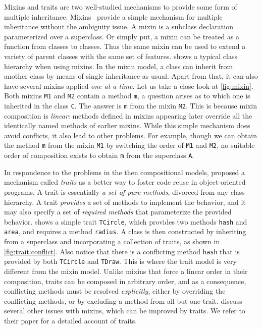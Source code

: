 Mixins and traits are two well-studied mechanisms to provide some form of
multiple inheritance. Mixins~\citep{bracha1990mixin} provide a simple mechanism
for multiple inheritance without the ambiguity issue. A mixin is a subclass
declaration parameterized over a superclass. Or simply put, a mixin can be
treated as a function from classes to classes. Thus the same mixin can be used to
extend a variety of parent classes with the same set of features.
 shows a typical class hierarchy when using mixins. In the mixin
model, a class can inherit from another class by means of single inheritance as
usual. Apart from that, it can also have several mixins applied \emph{one at a
  time}. Let us take a close look at \cref{fig:mixin}. Both mixins
\lstinline{M1} and \lstinline{M2} contain a method \lstinline{m}, a question
arises as to which one is inherited in the class \lstinline{C}. The answer is
\lstinline{m} from the mixin \lstinline{M2}. This is because mixin composition
is \emph{linear}: methods defined in mixins appearing later override all the
identically named methods of earlier mixins. While this simple mechanism does
avoid conflicts, it also lead to other problems. For example, though we can
obtain the method \lstinline{m} from the mixin \lstinline{M1} by switching the
order of \lstinline{M1} and \lstinline{M2}, no suitable order of composition
exists to obtain \lstinline{m} from the superclass \lstinline{A}.

In respondence to the problems in the then compositional models,
\citet{scharli2003traits} proposed a mechanism called \emph{traits} as a
better way to foster code reuse in object-oriented programs. A trait is
essentially \emph{a set of pure methods}, divorced from any class hierarchy. A
trait \emph{provides} a set of methods to implement the behavior, and it may
also specify a set of \emph{required methods} that parameterize the provided
behavior.  shows a simple trait \lstinline{TCircle}, which
provides two methods \lstinline{hash} and \lstinline{area}, and requires a
method \lstinline{radius}. A class is then constructed by inheriting from a
superclass and incorporating a collection of traits, as shown in
\cref{fig:trait:conflict}. Also notice that there is a conflicting method
\lstinline{hash} that is provided by both \lstinline{TCircle} and
\lstinline{TDraw}. This is where the trait model is very different from the
mixin model. Unlike mixins that force a linear order in their composition,
traits can be composed in arbitrary order, and as a consequence, conflicting
methods must be resolved \emph{explicitly}, either by overriding the
conflicting methods, or by excluding a method from all but one trait.
\citet{scharli2003traits} discuss several other issues with mixins, which can be
improved by traits. We refer to their paper for a detailed account of traits.


